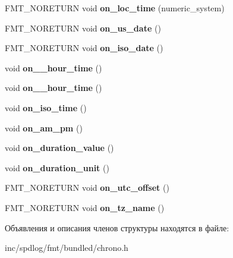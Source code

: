 \begin{DoxyCompactItemize}
F\+M\+T\+\_\+\+N\+O\+R\+E\+T\+U\+RN void {\bfseries on\+\_\+loc\+\_\+time} (numeric\+\_\+system)
\item 
\mbox{\label{structinternal_1_1chrono__format__checker_af9aab3cac53bcf690fd328f2e489d8a9}} 
F\+M\+T\+\_\+\+N\+O\+R\+E\+T\+U\+RN void {\bfseries on\+\_\+us\+\_\+date} ()
\item 
\mbox{\label{structinternal_1_1chrono__format__checker_a2b40a3326198e4611911f8aca1f3395e}} 
F\+M\+T\+\_\+\+N\+O\+R\+E\+T\+U\+RN void {\bfseries on\+\_\+iso\+\_\+date} ()
\item 
\mbox{\label{structinternal_1_1chrono__format__checker_afa28c3c40e56698406a3715be964bd5a}} 
void {\bfseries on\+\_\+\_\+hour\+\_\+time} ()
\item 
\mbox{\label{structinternal_1_1chrono__format__checker_a72742f3660b587ad54e226e925d86d02}} 
void {\bfseries on\+\_\+\_\+hour\+\_\+time} ()
\item 
\mbox{\label{structinternal_1_1chrono__format__checker_aff6faa04fb465c1cf0a9593f10a784e8}} 
void {\bfseries on\+\_\+iso\+\_\+time} ()
\item 
\mbox{\label{structinternal_1_1chrono__format__checker_ae5993fdce596a777dfd4d8e1c8b1373b}} 
void {\bfseries on\+\_\+am\+\_\+pm} ()
\item 
\mbox{\label{structinternal_1_1chrono__format__checker_a05c1aaf90683ec3f5fde7009ab9035d0}} 
void {\bfseries on\+\_\+duration\+\_\+value} ()
\item 
\mbox{\label{structinternal_1_1chrono__format__checker_ab4b1d7b617b60bd1a9a0689188bfdc49}} 
void {\bfseries on\+\_\+duration\+\_\+unit} ()
\item 
\mbox{\label{structinternal_1_1chrono__format__checker_ae4057a6803c7ff1f1bb6c54fe444566e}} 
F\+M\+T\+\_\+\+N\+O\+R\+E\+T\+U\+RN void {\bfseries on\+\_\+utc\+\_\+offset} ()
\item 
\mbox{\label{structinternal_1_1chrono__format__checker_afa2daaa00944532d08c3a9219f1b9279}} 
F\+M\+T\+\_\+\+N\+O\+R\+E\+T\+U\+RN void {\bfseries on\+\_\+tz\+\_\+name} ()
\end{DoxyCompactItemize}


Объявления и описания членов структуры находятся в файле\+:\begin{DoxyCompactItemize}
\item 
inc/spdlog/fmt/bundled/chrono.\+h\end{DoxyCompactItemize}
